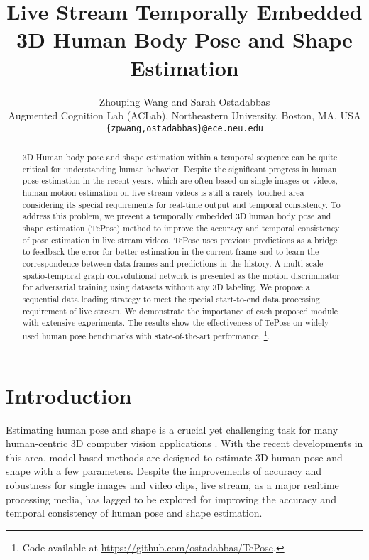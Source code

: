 \documentclass[10pt,twocolumn,letterpaper]{article}
\begin{document}
\title{Live Stream Temporally Embedded 3D Human Body Pose and Shape Estimation}

\author{Zhouping Wang and Sarah Ostadabbas\\
Augmented Cognition Lab (ACLab), Northeastern University, Boston, MA, USA\\
{\tt\small \{zpwang,ostadabbas\}@ece.neu.edu}
}

\maketitle
\thispagestyle{empty}


\begin{abstract}
  3D Human body pose and shape estimation within a temporal sequence can be quite critical for understanding human behavior. Despite the significant progress in  human pose estimation  in the recent years, which are often based on single images or videos, human motion estimation on live stream videos is still a rarely-touched area considering its special requirements for real-time output and temporal consistency. To address this problem, we present a temporally embedded 3D human body pose and shape estimation (TePose) method to improve the accuracy and temporal consistency of pose estimation in live stream videos. TePose uses previous predictions as a bridge to feedback the error for better estimation in the current frame and to learn the correspondence between data frames and predictions in the history. A multi-scale spatio-temporal graph convolutional network is presented as the motion discriminator for adversarial training using datasets without any 3D labeling. We propose a sequential data loading strategy to meet the special start-to-end data processing requirement of live stream. We demonstrate the importance of each proposed module with extensive experiments. The results show the effectiveness of TePose on widely-used human pose benchmarks  with state-of-the-art performance. \footnote{Code available at \href{https://github.com/ostadabbas/TePose}{https://github.com/ostadabbas/TePose}.}.
  
\end{abstract}


\section{Introduction}
Estimating human pose and shape is a crucial yet challenging task for many human-centric 3D computer vision applications \cite{boulic1997integration,presti20163d,luvizon2017learning,li2020detailed,li2020pastanet}. With the recent developments in this area, model-based methods are designed to estimate 3D human pose and shape with a few parameters. Despite the improvements of accuracy and robustness for single images and video clips, live stream, as a major realtime processing media, has lagged to be explored for improving the accuracy and temporal consistency of human pose and shape estimation.
\end{document}
